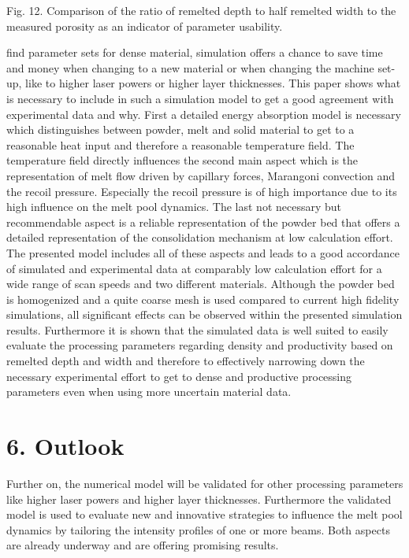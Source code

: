 \documentclass[10pt]{article}
\begin{document}
Fig. 12. Comparison of the ratio of remelted depth to half remelted width to the measured porosity as an indicator of parameter usability.

find parameter sets for dense material, simulation offers a chance to save time and money when changing to a new material or when changing the machine set-up, like to higher laser powers or higher layer thicknesses. This paper shows what is necessary to include in such a simulation model to get a good agreement with experimental data and why. First a detailed energy absorption model is necessary which distinguishes between powder, melt and solid material to get to a reasonable heat input and therefore a reasonable temperature field. The temperature field directly influences the second main aspect which is the representation of melt flow driven by capillary forces, Marangoni convection and the recoil pressure. Especially the recoil pressure is of high importance due to its high influence on the melt pool dynamics. The last not necessary but recommendable aspect is a reliable representation of the powder bed that offers a detailed representation of the consolidation mechanism at low calculation effort. The presented model includes all of these aspects and leads to a good accordance of simulated and experimental data at comparably low calculation effort for a wide range of scan speeds and two different materials. Although the powder bed is homogenized and a quite coarse mesh is used compared to current high fidelity simulations, all significant effects can be observed within the presented simulation results. Furthermore it is shown that the simulated data is well suited to easily evaluate the processing parameters regarding density and productivity based on remelted depth and width and therefore to effectively narrowing down the necessary experimental effort to get to dense and productive processing parameters even when using more uncertain material data.

\section*{6. Outlook}
Further on, the numerical model will be validated for other processing parameters like higher laser powers and higher layer thicknesses. Furthermore the validated model is used to evaluate new and innovative strategies to influence the melt pool dynamics by tailoring the intensity profiles of one or more beams. Both aspects are already underway and are offering promising results.
\end{document}
